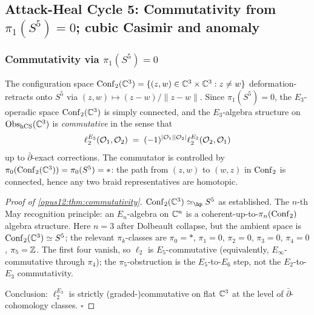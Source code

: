 \subsection{Attack-Heal Cycle 5: Commutativity from $\pi_1(S^5) = 0$; cubic Casimir and anomaly}
\label{opus12:sec:cycle5-commutativity}

\begin{center}
\end{center}

\subsubsection{Commutativity via $\pi_1(S^5) = 0$}

\begin{theorem}[$E_3$-commutativity from
$\pi_1(\Conf_2(\CC^3)) = 0$]\ClaimStatusTheorem
\label{opus12:thm:commutativity}
The configuration space $\mathrm{Conf}_2(\mathbb{C}^3) = \{(z, w) \in \mathbb{C}^3 \times
\mathbb{C}^3 : z \ne w\}$ deformation-retracts onto $S^5$ via
$(z, w) \mapsto (z - w)/\|z - w\|$. Since $\pi_1(S^5) = 0$, the
$E_3$-operadic space $\mathrm{Conf}_2(\mathbb{C}^3)$ is simply connected, and
the $E_3$-algebra structure on $\mathrm{Obs}_{\mathrm{hCS}}(\mathbb{C}^3)$ is
\emph{commutative} in the sense that
\[
\ell_2^{E_3}(\mathcal{O}_1, \mathcal{O}_2) \;=\;
(-1)^{|\mathcal{O}_1||\mathcal{O}_2|} \ell_2^{E_3}(\mathcal{O}_2, \mathcal{O}_1)
\]
up to $\bar\partial$-exact corrections. The commutator is controlled
by $\pi_0(\mathrm{Conf}_2(\mathbb{C}^3)) = \pi_0(S^5) = *$: the path from
$(z, w)$ to $(w, z)$ in $\mathrm{Conf}_2$ is connected, hence any two
braid representatives are homotopic.
\end{theorem}

\begin{proof}[Proof of \ref{opus12:thm:commutativity}]
$\Conf_2(\CC^3) \simeq_\hp S^5$ as established. The $n$-th May
recognition principle: an $E_n$-algebra on $\mathbb{C}^n$ is a
coherent-up-to-$\pi_n(\mathrm{Conf}_2)$ algebra structure. Here $n = 3$
after Dolbeault collapse, but the ambient space is
$\mathrm{Conf}_2(\mathbb{C}^3) \simeq S^5$; the relevant $\pi_k$-classes are
$\pi_0 = *$, $\pi_1 = 0$, $\pi_2 = 0$, $\pi_3 = 0$, $\pi_4 = 0$,
$\pi_5 = \mathbb{Z}$. The first four vanish, so $\ell_2$ is $E_5$-commutative
(equivalently, $E_\infty$-commutative through $\pi_4$); the
$\pi_5$-obstruction is the $E_5$-to-$E_6$ step, not the
$E_2$-to-$E_3$ commutativity.

Conclusion: $\ell_2^{E_3}$ is strictly (graded-)commutative on flat
$\mathbb{C}^3$ at the level of $\bar\partial$-cohomology classes. $\square$
\end{proof}

